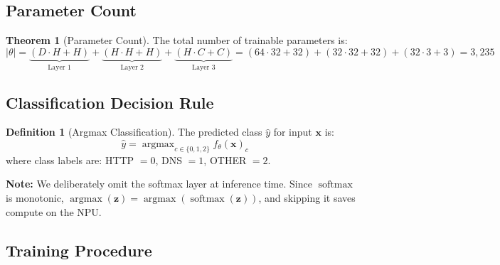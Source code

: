 \documentclass[11pt,a4paper,twoside]{article}
\theoremstyle{definition}
\newtheorem{definition}{Definition}[section]
\newtheorem{theorem}{Theorem}[section]
\theoremstyle{remark}
\newcommand{\argmax}{\operatorname{argmax}}
\newcommand{\softmax}{\operatorname{softmax}}
\newcommand{\vect}[1]{\mathbf{#1}}
\begin{document}
\subsection{Parameter Count}

\begin{theorem}[Parameter Count]
The total number of trainable parameters is:
\begin{equation}
|\theta| = \underbrace{(D \cdot H + H)}_{\text{Layer 1}} + \underbrace{(H \cdot H + H)}_{\text{Layer 2}} + \underbrace{(H \cdot C + C)}_{\text{Layer 3}}
= (64 \cdot 32 + 32) + (32 \cdot 32 + 32) + (32 \cdot 3 + 3) = 3{,}235
\end{equation}
\end{theorem}

\subsection{Classification Decision Rule}

\begin{definition}[Argmax Classification]
The predicted class $\hat{y}$ for input $\vect{x}$ is:
\begin{equation}
\hat{y} = \argmax_{c \in \{0,1,2\}} f_\theta(\vect{x})_c
\end{equation}
where class labels are: HTTP $= 0$, DNS $= 1$, OTHER $= 2$.

\textbf{Note:} We deliberately omit the softmax layer at inference time. Since $\softmax$ is monotonic, $\argmax(\vect{z}) = \argmax(\softmax(\vect{z}))$, and skipping it saves compute on the NPU.
\end{definition}

\subsection{Training Procedure}
\end{document}
